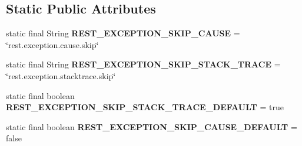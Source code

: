 \subsection*{Static Public Attributes}
\begin{DoxyCompactItemize}
\item 
\hypertarget{classorg_1_1elasticsearch_1_1_elasticsearch_exception_a7d8caafa358353c0522e6c06104fa0b7}{}\label{classorg_1_1elasticsearch_1_1_elasticsearch_exception_a7d8caafa358353c0522e6c06104fa0b7} 
static final String {\bfseries R\+E\+S\+T\+\_\+\+E\+X\+C\+E\+P\+T\+I\+O\+N\+\_\+\+S\+K\+I\+P\+\_\+\+C\+A\+U\+SE} = \char`\"{}rest.\+exception.\+cause.\+skip\char`\"{}
\item 
\hypertarget{classorg_1_1elasticsearch_1_1_elasticsearch_exception_a7306c9114fc2edbfb3075b2f199f2cca}{}\label{classorg_1_1elasticsearch_1_1_elasticsearch_exception_a7306c9114fc2edbfb3075b2f199f2cca} 
static final String {\bfseries R\+E\+S\+T\+\_\+\+E\+X\+C\+E\+P\+T\+I\+O\+N\+\_\+\+S\+K\+I\+P\+\_\+\+S\+T\+A\+C\+K\+\_\+\+T\+R\+A\+CE} = \char`\"{}rest.\+exception.\+stacktrace.\+skip\char`\"{}
\item 
\hypertarget{classorg_1_1elasticsearch_1_1_elasticsearch_exception_a9d080681e7c644310df9f46cbc109bd7}{}\label{classorg_1_1elasticsearch_1_1_elasticsearch_exception_a9d080681e7c644310df9f46cbc109bd7} 
static final boolean {\bfseries R\+E\+S\+T\+\_\+\+E\+X\+C\+E\+P\+T\+I\+O\+N\+\_\+\+S\+K\+I\+P\+\_\+\+S\+T\+A\+C\+K\+\_\+\+T\+R\+A\+C\+E\+\_\+\+D\+E\+F\+A\+U\+LT} = true
\item 
\hypertarget{classorg_1_1elasticsearch_1_1_elasticsearch_exception_ac4b24c901790fbef8a3fc1e7e63623d7}{}\label{classorg_1_1elasticsearch_1_1_elasticsearch_exception_ac4b24c901790fbef8a3fc1e7e63623d7} 
static final boolean {\bfseries R\+E\+S\+T\+\_\+\+E\+X\+C\+E\+P\+T\+I\+O\+N\+\_\+\+S\+K\+I\+P\+\_\+\+C\+A\+U\+S\+E\+\_\+\+D\+E\+F\+A\+U\+LT} = false
\end{DoxyCompactItemize}
